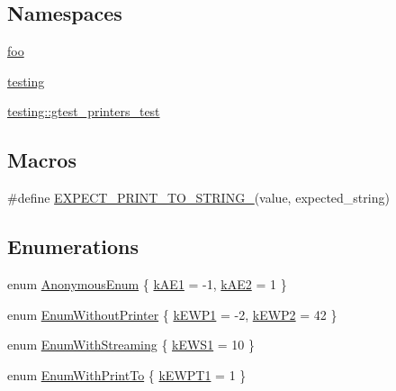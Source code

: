 \subsection*{Namespaces}
\begin{DoxyCompactItemize}
\item 
 \hyperlink{namespacefoo}{foo}
\item 
 \hyperlink{namespacetesting}{testing}
\item 
 \hyperlink{namespacetesting_1_1gtest__printers__test}{testing\+::gtest\+\_\+printers\+\_\+test}
\end{DoxyCompactItemize}
\subsection*{Macros}
\begin{DoxyCompactItemize}
\item 
\#define \hyperlink{gtest-printers__test_8cc_aa0ed482a6777cce04eecd24c530c78ec}{E\+X\+P\+E\+C\+T\+\_\+\+P\+R\+I\+N\+T\+\_\+\+T\+O\+\_\+\+S\+T\+R\+I\+N\+G\+\_\+}(value,  expected\+\_\+string)
\end{DoxyCompactItemize}
\subsection*{Enumerations}
\begin{DoxyCompactItemize}
\item 
enum \hyperlink{gtest-printers__test_8cc_a7a5ee9fe858568a85d80af1312aefb8b}{Anonymous\+Enum} \{ \hyperlink{gtest-printers__test_8cc_a7a5ee9fe858568a85d80af1312aefb8ba1a36d0a263e18ed9a4e3562b4cd6e8e6}{k\+A\+E1} = -\/1, 
\hyperlink{gtest-printers__test_8cc_a7a5ee9fe858568a85d80af1312aefb8ba67ee14379c1b9fd5ae5616a1b3f0d5d5}{k\+A\+E2} = 1
 \}
\item 
enum \hyperlink{gtest-printers__test_8cc_a404f735da62338180a19ae16f80e09c8}{Enum\+Without\+Printer} \{ \hyperlink{gtest-printers__test_8cc_a404f735da62338180a19ae16f80e09c8ad65f74b95d76a8a471a823fa69139393}{k\+E\+W\+P1} = -\/2, 
\hyperlink{gtest-printers__test_8cc_a404f735da62338180a19ae16f80e09c8ae3b0361263e2ff24730ff9f2e2177a11}{k\+E\+W\+P2} = 42
 \}
\item 
enum \hyperlink{gtest-printers__test_8cc_a52d9f846ca7a081ba3acf88dd6cd46dc}{Enum\+With\+Streaming} \{ \hyperlink{gtest-printers__test_8cc_a52d9f846ca7a081ba3acf88dd6cd46dca8d4bcf477f5a23ce8569a2a404327839}{k\+E\+W\+S1} = 10
 \}
\item 
enum \hyperlink{gtest-printers__test_8cc_a904d619d593201ed509be794aed041ec}{Enum\+With\+Print\+To} \{ \hyperlink{gtest-printers__test_8cc_a904d619d593201ed509be794aed041eca72ccaf1f38be3cad8d1d6b0811467125}{k\+E\+W\+P\+T1} = 1
 \}
\end{DoxyCompactItemize}
